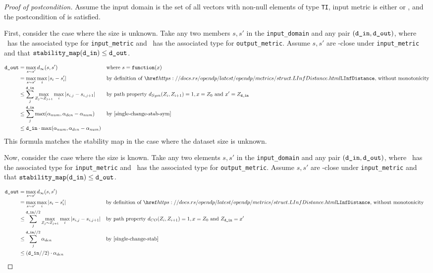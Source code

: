 \documentclass{article}
\begin{document}
\begin{proof}[Proof of postcondition]
    Assume the input domain is the set of all vectors with non-null elements of type \texttt{TI},
    input metric is either  or ,
    and the postcondition of \function is satisfied.

    First, consider the case where the size is unknown.
    Take any two members $s, s'$ in the \texttt{input\_domain} and any pair $(\texttt{d\_in}, \texttt{d\_out})$, 
    where \din\ has the associated type for \texttt{input\_metric} and \dout\ has the associated type for \texttt{output\_metric}.
    Assume $s, s'$ are \din-close under \texttt{input\_metric} and that $\texttt{stability\_map}(\texttt{d\_in}) \leq \texttt{d\_out}$. 

    \begin{align*}
        \dout &= \max\limits_{s \sim s'} d_{\infty}(s, s') &&\text{where } s = \function(x)\\
        &= \max\limits_{s \sim s'} \max\limits_{i} |s_i - s'_i| &&\text{by definition of }\rustdoc{metrics/struct}{LInfDistance} \text{, without monotonicity} \\
        &\leq \sum_j^{\din} \max\limits_{Z_{j} \sim Z_{j+1}} \max\limits_{i} |s_{i,j} - s_{i,j+1}| &&\text{by path property } d_{Sym}(Z_i, Z_{i+1}) = 1, x = Z_0 \text{ and } x' = Z_\din \\
        &\leq \sum_j^{\din} \max(\alpha_{num}, \alpha_{den} - \alpha_{num}) &&\text{by \ref{single-change-stab-sym}} \\
        &\leq \din \cdot \max(\alpha_{num}, \alpha_{den} - \alpha_{num}) \\
    \end{align*}
    \label{sec:unknown-size}
    This formula matches the stability map in the case where the dataset size is unknown.

    Now, consider the case where the size is known.
    Take any two elements $s, s'$ in the \texttt{input\_domain} and any pair $(\texttt{d\_in}, \texttt{d\_out})$, 
    where \din\ has the associated type for \texttt{input\_metric} and \dout\ has the associated type for \texttt{output\_metric}.
    Assume $s, s'$ are \din-close under \texttt{input\_metric} and that $\texttt{stability\_map}(\texttt{d\_in}) \leq \texttt{d\_out}$. 

    \begin{align*}
        \dout &= \max\limits_{s \sim s'} d_{\infty}(s, s') \\
        &= \max\limits_{s \sim s'} \max\limits_{i} |s_i - s'_i| &&\text{by definition of }\rustdoc{metrics/struct}{LInfDistance}\text{, without monotonicity} \\
        &\leq \sum_j^{\din // 2} \max\limits_{Z_{j} \sim Z_{j+1}} \max\limits_{i} |s_{i,j} - s_{i,j+1}| &&\text{by path property } d_{CO}(Z_i, Z_{i+1}) = 1, x = Z_0 \text{ and } Z_\din = x' \\
        &\leq \sum_j^{\din // 2} \alpha_{den} &&\text{by \ref{single-change-stab}} \\
        &\leq (\din // 2) \cdot \alpha_{den} \\
    \end{align*}


\end{proof}
\end{document}

